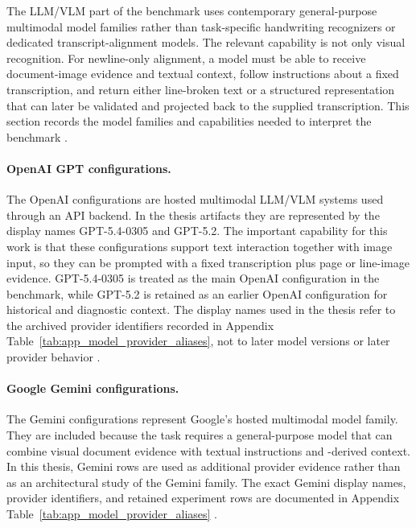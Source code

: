 The LLM/VLM part of the benchmark uses contemporary general-purpose multimodal model families rather than task-specific handwriting recognizers or dedicated transcript-alignment models. The relevant capability is not only visual recognition. For newline-only alignment, a model must be able to receive document-image evidence and textual context, follow instructions about a fixed transcription, and return either line-broken text or a structured representation that can later be validated and projected back to the supplied transcription. This section records the model families and capabilities needed to interpret the benchmark .

\paragraph{OpenAI GPT configurations.}
The OpenAI configurations are hosted multimodal LLM/VLM systems used through an API backend. In the thesis artifacts they are represented by the display names GPT-5.4-0305 and GPT-5.2. The important capability for this work is that these configurations support text interaction together with image input, so they can be prompted with a fixed transcription plus page or line-image evidence. GPT-5.4-0305 is treated as the main OpenAI configuration in the benchmark, while GPT-5.2 is retained as an earlier OpenAI configuration for historical and diagnostic context. The display names used in the thesis refer to the archived provider identifiers recorded in Appendix Table~\ref{tab:app_model_provider_aliases}, not to later model versions or later provider behavior .

\paragraph{Google Gemini configurations.}
The Gemini configurations represent Google's hosted multimodal model family. They are included because the task requires a general-purpose model that can combine visual document evidence with textual instructions and \OCRHTR{}-derived context. In this thesis, Gemini rows are used as additional provider evidence rather than as an architectural study of the Gemini family. The exact Gemini display names, provider identifiers, and retained experiment rows are documented in Appendix Table~\ref{tab:app_model_provider_aliases} .

